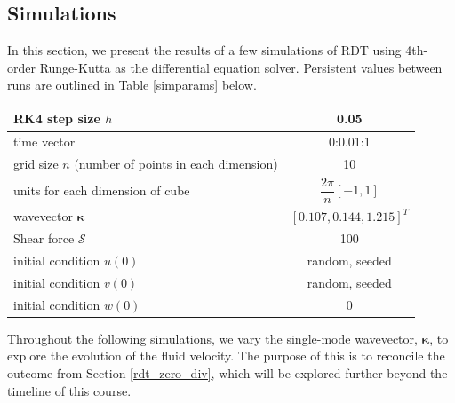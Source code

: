 \documentclass[paper=a4, fontsize=11pt]{scrartcl} %
\numberwithin{equation}{section} %
\numberwithin{figure}{section} %
\numberwithin{table}{section} %
\begin{document}

\subsection{Simulations}

In this section, we present the results of a few simulations of RDT using 4th-order Runge-Kutta as the differential equation solver. Persistent values between runs are outlined in Table \ref{simparams} below.

\renewcommand{\arraystretch}{2}
\begin{center}
\begin{tabular}{ | p{4cm} | c  |}

    \hline
    RK4 step size $h$       &   0.05 \\ \hline
    time  vector &  0:0.01:1 \\ \hline
    grid size $n$ (number of points in each dimension) &   10 \\ \hline
    units for each dimension of cube & $\dfrac{2\pi}{n} [-1,1] $ \\ \hline
    wavevector $\bm{\kappa}$ & $[0.107, 0.144, 1.215 ]^T$ \\ \hline
    Shear force $\mathcal{S}$ & 100 \\ \hline
    initial condition $u(0)$ & random, seeded \\ \hline
    initial condition $v(0)$ & random, seeded \\ \hline
    initial condition $w(0)$ & 0 \\ \hline
\end{tabular}
 \label{simparams}
\end{center}

Throughout the following simulations, we vary the single-mode wavevector, $\bm{\kappa}$, to explore the evolution of the fluid velocity. The purpose of this is to reconcile the outcome from Section \ref{rdt_zero_div}, which will be explored further beyond the timeline of this course. 
\end{document}
